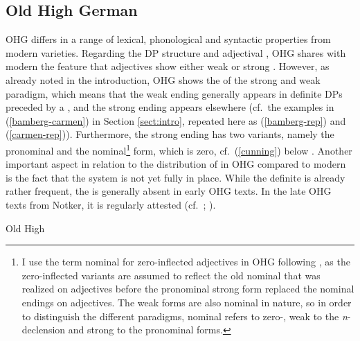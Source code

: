 \documentclass[output=paper,colorlinks,citecolor=brown]{langscibook}
\begin{document}
\subsection{Old High German}\label{subsect:ohg}

OHG differs in a range of lexical, phonological and syntactic properties from modern  varieties. Regarding the DP structure and adjectival , OHG shares with modern  the feature that adjectives show either weak or strong . However, as already noted in the introduction, OHG shows the  of the strong and weak paradigm, which means that the weak ending generally appears in definite DPs preceded by a , and the strong ending appears elsewhere (cf.~the examples in (\ref{bamberg-carmen}) in Section \ref{sect:intro}, repeated here as (\ref{bamberg-rep}) and (\ref{carmen-rep})). Furthermore, the strong ending has two variants, namely the pronominal and the nominal\footnote{I use the term nominal  for zero-inflected adjectives in OHG following \citet{Braune2018AHD}, as the zero-inflected variants are assumed to reflect the old nominal  that was realized on adjectives before the pronominal strong form replaced the nominal endings on adjectives. The weak forms are also nominal in nature, so in order to distinguish the different paradigms, nominal refers to zero-, weak to the \textit{n}-declension and strong to the pronominal forms.} form, which is zero, cf.~(\ref{cunning}) below \citep[298]{Braune2018AHD}. Another important aspect in relation to the distribution of  in OHG compared to modern  is the fact that the  system is not yet fully in place. While the definite  is already rather frequent, the   is generally absent in early OHG texts. In the late OHG texts from Notker, it is regularly attested (cf.~\citealp{Oubouzar1992}; \citealp{Presslich2000}).

\ea Old High  \label{bamberg-carmen-rep}
\z
\z 
\end{document}
